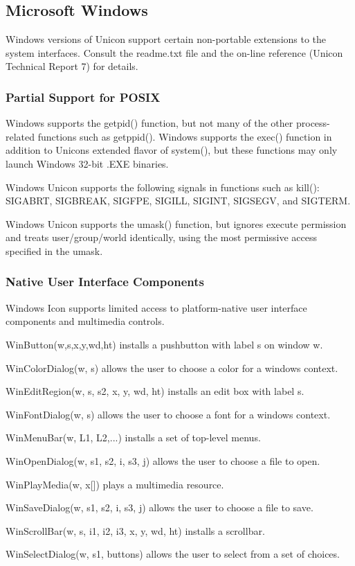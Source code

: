 \subsection[Microsoft Windows]{Microsoft Windows}
Windows versions of Unicon support certain non-portable extensions to
the system interfaces. Consult the readme.txt file and the on-line
reference (Unicon Technical Report 7) for details.

\subsubsection{Partial Support for POSIX}

Windows supports the getpid() function, but not many of the other
process-related functions such as getppid(). Windows supports the
exec() function in addition to Unicon{\textquotesingle}s extended
flavor of system(), but these functions may only launch Windows 32-bit
.EXE binaries.

Windows Unicon supports the following signals in functions such as
kill(): SIGABRT, SIGBREAK, SIGFPE, SIGILL, SIGINT, SIGSEGV, and
SIGTERM.

Windows Unicon supports the umask() function, but ignores execute
permission and treats user/group/world identically, using the most
permissive access specified in the umask.

\subsubsection{Native User Interface Components}

Windows Icon supports limited access to platform-native user interface
components and multimedia controls.

WinButton(w,s,x,y,wd,ht) installs a pushbutton with label s on window w.

WinColorDialog(w, s) allows the user to choose a color for a
window{\textquotesingle}s context.

WinEditRegion(w, s, s2, x, y, wd, ht) installs an edit box with label s.

WinFontDialog(w, s) allows the user to choose a font for a
window{\textquotesingle}s context.

WinMenuBar(w, L1, L2,...) installs a set of top-level menus.

WinOpenDialog(w, s1, s2, i, s3, j) allows the user to choose a file to
open.

WinPlayMedia(w, x[]) plays a multimedia resource.

WinSaveDialog(w, s1, s2, i, s3, j) allows the user to choose a file to
save.

WinScrollBar(w, s, i1, i2, i3, x, y, wd, ht) installs a scrollbar.

WinSelectDialog(w, s1, buttons) allows the user to select from a set of
choices.

